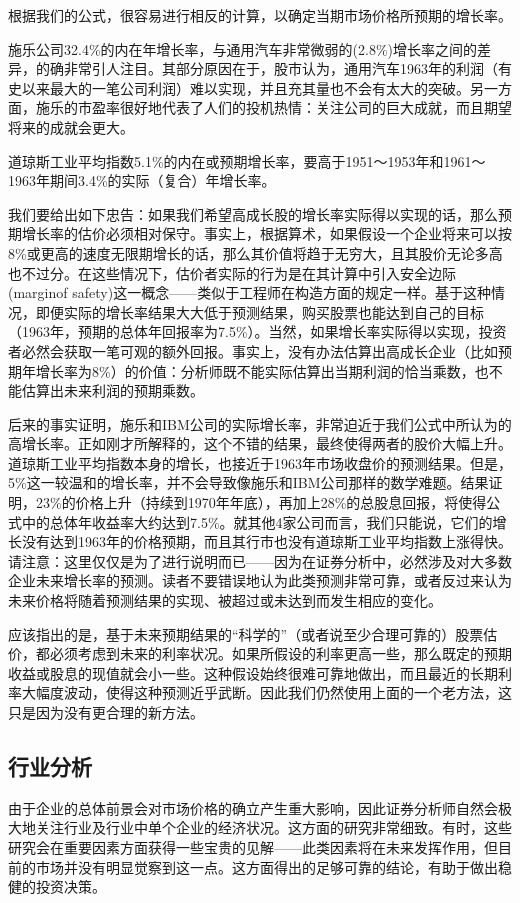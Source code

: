 \documentclass[12pt,oneside]{book}
\begin{document}
根据我们的公式，很容易进行相反的计算，以确定当期市场价格所预期的增长率。

施乐公司32.4\%的内在年增长率，与通用汽车非常微弱的(2.8\%)增长率之间的差异，的确非常引人注目。其部分原因在于，股市认为，通用汽车1963年的利润（有史以来最大的一笔公司利润）难以实现，并且充其量也不会有太大的突破。另一方面，施乐的市盈率很好地代表了人们的投机热情：关注公司的巨大成就，而且期望将来的成就会更大。

道琼斯工业平均指数5.1\%的内在或预期增长率，要高于1951～1953年和1961～1963年期间3.4\%的实际（复合）年增长率。


我们要给出如下忠告：如果我们希望高成长股的增长率实际得以实现的话，那么预期增长率的估价必须相对保守。事实上，根据算术，如果假设一个企业将来可以按8\%或更高的速度无限期增长的话，那么其价值将趋于无穷大，且其股价无论多高也不过分。在这些情况下，估价者实际的行为是在其计算中引入安全边际(marginof safety)这一概念——类似于工程师在构造方面的规定一样。基于这种情况，即便实际的增长率结果大大低于预测结果，购买股票也能达到自己的目标（1963年，预期的总体年回报率为7.5\%）。当然，如果增长率实际得以实现，投资者必然会获取一笔可观的额外回报。事实上，没有办法估算出高成长企业（比如预期年增长率为8\%）的价值：分析师既不能实际估算出当期利润的恰当乘数，也不能估算出未来利润的预期乘数。

后来的事实证明，施乐和IBM公司的实际增长率，非常迫近于我们公式中所认为的高增长率。正如刚才所解释的，这个不错的结果，最终使得两者的股价大幅上升。道琼斯工业平均指数本身的增长，也接近于1963年市场收盘价的预测结果。但是，5\%这一较温和的增长率，并不会导致像施乐和IBM公司那样的数学难题。结果证明，23\%的价格上升（持续到1970年年底），再加上28\%的总股息回报，将使得公式中的总体年收益率大约达到7.5\%。就其他4家公司而言，我们只能说，它们的增长没有达到1963年的价格预期，而且其行市也没有道琼斯工业平均指数上涨得快。请注意：这里仅仅是为了进行说明而已——因为在证券分析中，必然涉及对大多数企业未来增长率的预测。读者不要错误地认为此类预测非常可靠，或者反过来认为未来价格将随着预测结果的实现、被超过或未达到而发生相应的变化。

应该指出的是，基于未来预期结果的“科学的”（或者说至少合理可靠的）股票估价，都必须考虑到未来的利率状况。如果所假设的利率更高一些，那么既定的预期收益或股息的现值就会小一些。这种假设始终很难可靠地做出，而且最近的长期利率大幅度波动，使得这种预测近乎武断。因此我们仍然使用上面的一个老方法，这只是因为没有更合理的新方法。

\subsection{行业分析}
由于企业的总体前景会对市场价格的确立产生重大影响，因此证券分析师自然会极大地关注行业及行业中单个企业的经济状况。这方面的研究非常细致。有时，这些研究会在重要因素方面获得一些宝贵的见解——此类因素将在未来发挥作用，但目前的市场并没有明显觉察到这一点。这方面得出的足够可靠的结论，有助于做出稳健的投资决策。
\end{document}
